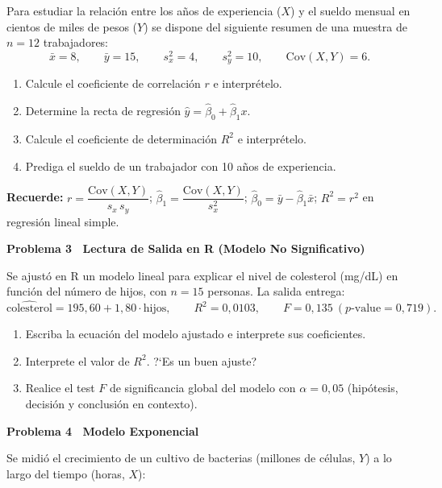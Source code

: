\documentclass[10pt,letterpaper]{article}
\newcommand{\seccion}[1]{%
  \vspace{2pt}%
  \begin{tcolorbox}[enhanced,colback=white,colframe=black,arc=0pt,boxrule=0pt,
    leftrule=2pt,left=6pt,right=6pt,top=1pt,bottom=1pt]
    {\normalsize\bfseries\sffamily #1}
  \end{tcolorbox}%
  \vspace{1pt}%
}
\newcommand{\reglacaja}[1]{%
  \begin{tcolorbox}[enhanced,colback=white,colframe=black,arc=0pt,boxrule=0.5pt,
    left=6pt,right=6pt,top=2pt,bottom=2pt,breakable]
  \small\sffamily #1
  \end{tcolorbox}%
}
\begin{document}
\noindent\sffamily\small Para estudiar la relaci\'on entre los a\~nos de experiencia ($X$) y el sueldo mensual en cientos de miles de pesos ($Y$) se dispone del siguiente resumen de una muestra de $n=12$ trabajadores:
\[
\bar{x}=8,\qquad \bar{y}=15,\qquad s_x^{2}=4,\qquad s_y^{2}=10,\qquad \mathrm{Cov}(X,Y)=6.
\]

\begin{enumerate}[leftmargin=1.2cm, label=\textbf{\alph*)}, itemsep=2pt, topsep=2pt]
  \item Calcule el coeficiente de correlaci\'on $r$ e interpr\'etelo.
  \item Determine la recta de regresi\'on $\hat{y}=\hat{\beta}_0+\hat{\beta}_1 x$.
  \item Calcule el coeficiente de determinaci\'on $R^2$ e interpr\'etelo.
  \item Prediga el sueldo de un trabajador con 10 a\~nos de experiencia.
\end{enumerate}

\reglacaja{%
\textbf{Recuerde:} $r=\dfrac{\mathrm{Cov}(X,Y)}{s_x\,s_y}$;\quad
$\hat{\beta}_1=\dfrac{\mathrm{Cov}(X,Y)}{s_x^{2}}$;\quad
$\hat{\beta}_0=\bar{y}-\hat{\beta}_1\bar{x}$;\quad
$R^2=r^2$ en regresi\'on lineal simple.%
}

\seccion{Problema 3 \textendash\ Lectura de Salida en \textsf{R} (Modelo No Significativo)}

\noindent\sffamily\small Se ajust\'o en \textsf{R} un modelo lineal para explicar el nivel de colesterol (mg/dL) en funci\'on del n\'umero de hijos, con $n=15$ personas. La salida entrega:
\[
\widehat{\text{colesterol}} = 195{,}60 + 1{,}80\cdot\text{hijos},\qquad
R^{2}=0{,}0103,\qquad F=0{,}135 \ (p\text{-value}=0{,}719).
\]

\begin{enumerate}[leftmargin=1.2cm, label=\textbf{\alph*)}, itemsep=2pt, topsep=2pt]
  \item Escriba la ecuaci\'on del modelo ajustado e interprete sus coeficientes.
  \item Interprete el valor de $R^{2}$. ?`Es un buen ajuste?
  \item Realice el test $F$ de significancia global del modelo con $\alpha=0{,}05$ (hip\'otesis, decisi\'on y conclusi\'on en contexto).
\end{enumerate}

\seccion{Problema 4 \textendash\ Modelo Exponencial}

\noindent\sffamily\small Se midi\'o el crecimiento de un cultivo de bacterias (millones de c\'elulas, $Y$) a lo largo del tiempo (horas, $X$):
\end{document}
